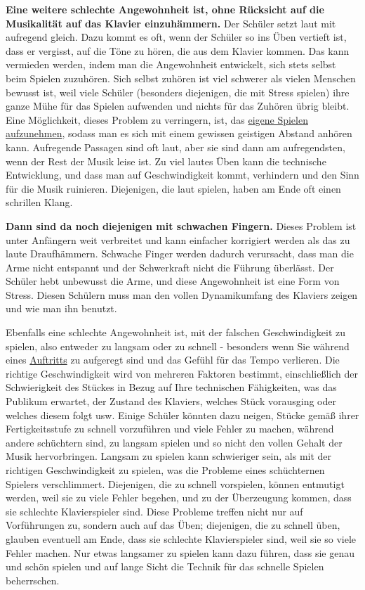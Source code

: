\textbf{Eine weitere schlechte Angewohnheit ist, ohne Rücksicht auf die Musikalität auf das Klavier einzuhämmern.}
Der Schüler setzt laut mit aufregend gleich.
Dazu kommt es oft, wenn der Schüler so ins Üben vertieft ist, dass er vergisst, auf die Töne zu hören, die aus dem Klavier kommen.
Das kann vermieden werden, indem man die Angewohnheit entwickelt, sich stets selbst beim Spielen zuzuhören.
Sich selbst zuhören ist viel schwerer als vielen Menschen bewusst ist, weil viele Schüler (besonders diejenigen, die mit Stress spielen) ihre ganze Mühe für das Spielen aufwenden und nichts für das Zuhören übrig bleibt.
Eine Möglichkeit, dieses Problem zu verringern, ist, das \hyperref[c1iii13]{eigene Spielen aufzunehmen}, sodass man es sich mit einem gewissen geistigen Abstand anhören kann.
Aufregende Passagen sind oft laut, aber sie sind dann am aufregendsten, wenn der Rest der Musik leise ist.
Zu viel lautes Üben kann die technische Entwicklung, und dass man auf Geschwindigkeit kommt, verhindern und den Sinn für die Musik ruinieren.
Diejenigen, die laut spielen, haben am Ende oft einen schrillen Klang.

\textbf{Dann sind da noch diejenigen mit schwachen Fingern.}
Dieses Problem ist unter Anfängern weit verbreitet und kann einfacher korrigiert werden als das zu laute Draufhämmern.
Schwache Finger werden dadurch verursacht, dass man die Arme nicht entspannt und der Schwerkraft nicht die Führung überlässt.
Der Schüler hebt unbewusst die Arme, und diese Angewohnheit ist eine Form von Stress.
Diesen Schülern muss man den vollen Dynamikumfang des Klaviers zeigen und wie man ihn benutzt.

Ebenfalls eine schlechte Angewohnheit ist, mit der falschen Geschwindigkeit zu spielen, also entweder zu langsam oder zu schnell - besonders wenn Sie während eines \hyperref[c1iii14]{Auftritts} zu aufgeregt sind und das Gefühl für das Tempo verlieren.
Die richtige Geschwindigkeit wird von mehreren Faktoren bestimmt, einschließlich der Schwierigkeit des Stückes in Bezug auf Ihre technischen Fähigkeiten, was das Publikum erwartet, der Zustand des Klaviers, welches Stück vorausging oder welches diesem folgt usw.
Einige Schüler könnten dazu neigen, Stücke gemäß ihrer Fertigkeitsstufe zu schnell vorzuführen und viele Fehler zu machen, während andere schüchtern sind, zu langsam spielen und so nicht den vollen Gehalt der Musik hervorbringen.
Langsam zu spielen kann schwieriger sein, als mit der richtigen Geschwindigkeit zu spielen, was die Probleme eines schüchternen Spielers verschlimmert.
Diejenigen, die zu schnell vorspielen, können entmutigt werden, weil sie zu viele Fehler begehen, und zu der Überzeugung kommen, dass sie schlechte Klavierspieler sind.
Diese Probleme treffen nicht nur auf Vorführungen zu, sondern auch auf das Üben;
diejenigen, die zu schnell üben, glauben eventuell am Ende, dass sie schlechte Klavierspieler sind, weil sie so viele Fehler machen.
Nur etwas langsamer zu spielen kann dazu führen, dass sie genau und schön spielen und auf lange Sicht die Technik für das schnelle Spielen beherrschen.

